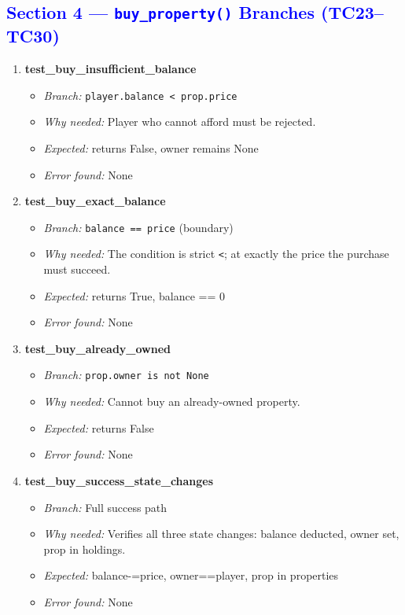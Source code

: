 \documentclass{article}
\begin{document}
\subsection*{\textcolor{blue}{Section 4 — \texttt{buy\_property()} Branches (TC23–TC30)}}

\begin{enumerate}[resume, label=\textbf{TC\arabic*.}]

  \item \textbf{test\_buy\_insufficient\_balance}
  \begin{itemize}[noitemsep]
    \item \textit{Branch:} \texttt{player.balance < prop.price}
    \item \textit{Why needed:} Player who cannot afford must be rejected.
    \item \textit{Expected:} returns False, owner remains None
    \item \textit{Error found:} None
  \end{itemize}

  \item \textbf{test\_buy\_exact\_balance}
  \begin{itemize}[noitemsep]
    \item \textit{Branch:} \texttt{balance == price} (boundary)
    \item \textit{Why needed:} The condition is strict \texttt{<}; at exactly the price the purchase must succeed.
    \item \textit{Expected:} returns True, balance == 0
    \item \textit{Error found:} None
  \end{itemize}

  \item \textbf{test\_buy\_already\_owned}
  \begin{itemize}[noitemsep]
    \item \textit{Branch:} \texttt{prop.owner is not None}
    \item \textit{Why needed:} Cannot buy an already-owned property.
    \item \textit{Expected:} returns False
    \item \textit{Error found:} None
  \end{itemize}

  \item \textbf{test\_buy\_success\_state\_changes}
  \begin{itemize}[noitemsep]
    \item \textit{Branch:} Full success path
    \item \textit{Why needed:} Verifies all three state changes: balance deducted, owner set, prop in holdings.
    \item \textit{Expected:} balance-=price, owner==player, prop in properties
    \item \textit{Error found:} None
  \end{itemize}


\end{enumerate}
\end{document}
